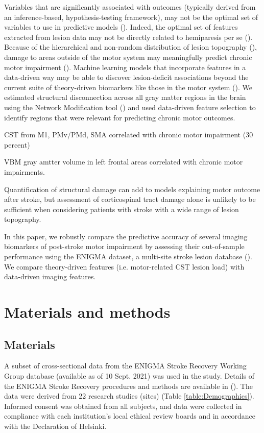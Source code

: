 \documentclass[10pt]{article}
\begin{document}
Variables that are significantly associated with outcomes (typically derived from an inference-based, hypothesis-testing framework), may not be the optimal set of variables to use in predictive models (\cite{Bzdok2020-py}). Indeed, the optimal set of features extracted from lesion data may not be directly related to hemiparesis per se (\cite{Sperber2021-lw}). Because of the hierarchical and non-random distribution of lesion topography (\cite{Mah2014-cb,Wang2019-dz}), damage to areas outside of the motor system may meaningfully predict chronic motor impairment (\cite{Sperber2021-lw}). Machine learning models that incorporate features in a data-driven way may be able to discover lesion-deficit associations beyond the current suite of theory-driven biomarkers like those in the motor system (\cite{Kasties2021-rm, Calesella2021-kp}). We estimated structural disconnection across all gray matter regions in the brain using the Network Modification tool (\cite{Kuceyeski2013-nk}) and used data-driven feature selection to identify regions that were relevant for predicting chronic motor outcomes. 

\cite{Kou2013-kv} CST from M1, PMv/PMd, SMA correlated with chronic motor impairment (30 percent)

\cite{Gauthier2012-za} VBM gray amtter volume in left frontal areas correlated with chronic motor impairments.


\cite{Park2016-te} Quantification of structural damage can add to models explaining motor outcome after stroke, but assessment of corticospinal tract damage alone is unlikely to be sufficient when considering patients with stroke with a wide range of lesion topography.


In this paper, we robustly compare the predictive accuracy of several imaging biomarkers of post-stroke motor impairment by assessing their out-of-sample performance using the ENIGMA dataset, a multi-site stroke lesion database (\cite{Liew2020-ps}). We compare theory-driven features (i.e. motor-related CST lesion load) with data-driven imaging features. 


\section{Materials and methods}
\subsection{Materials}
A subset of cross‐sectional data from the ENIGMA Stroke Recovery Working Group database (available as of 10 Sept. 2021) was used in the study. Details of the ENIGMA Stroke Recovery procedures and methods are available in (\cite{Liew2020-ps}). The data were derived from 22 research studies (sites) (Table \ref{table:Demographics}). Informed consent was obtained from all subjects, and data were collected in compliance with each institution’s local ethical review boards and in accordance with the Declaration of Helsinki.
\end{document}
